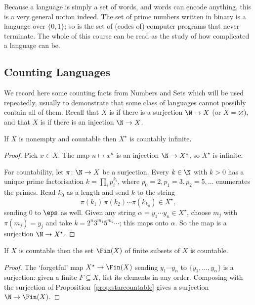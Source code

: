 Because a language is simply a set of words, and words can encode anything, this is a very general notion indeed. The set of prime numbers written in binary is a language over $\{0,1\}$; so is the set of (codes of) computer programs that never terminate. The whole of this course can be read as the study of how complicated a language can be.

\subsection{Counting Languages}

We record here some counting facts from Numbers and Sets which will be used repeatedly, usually to demonstrate that some class of languages cannot possibly contain all of them. Recall that $X$ is  if there is a surjection $\N \to X$ (or $X = \varnothing$), and that $X$ is  if there is an injection $\N \to X$.

\begin{proposition}\label{prop:starcountable}
	If $X$ is nonempty and countable then $X^\star$ is countably infinite.
\end{proposition}

\begin{proof}
	Pick $x \in X$. The map $n \mapsto x^n$ is an injection $\N \to X^\star$, so $X^\star$ is infinite.

	For countability, let $\pi \colon \N \to X$ be a surjection. Every $k \in \N$ with $k > 0$ has a unique prime factorisation $k = \prod_{i} p_i^{k_i}$, where $p_0 = 2, p_1 = 3, p_2 = 5, \dots$ enumerates the primes. Read $k_0$ as a length and send $k$ to the string
	$$\pi(k_1)\,\pi(k_2)\cdots\pi(k_{k_0}) \in X^\star,$$
	sending $0$ to $\eps$ as well. Given any string $\alpha = y_1\cdots y_n \in X^\star$, choose $m_j$ with $\pi(m_j) = y_j$ and take $k = 2^n 3^{m_1} 5^{m_2} \cdots$; this maps onto $\alpha$. So the map is a surjection $\N \to X^\star$.
\end{proof}

\begin{proposition}\label{prop:fincountable}
	If $X$ is countable then the set $\Fin(X)$ of finite subsets of $X$ is countable.
\end{proposition}

\begin{proof}
	The `forgetful' map $X^\star \to \Fin(X)$ sending $y_1\cdots y_n$ to $\{y_1, \dots, y_n\}$ is a surjection: given a finite $F \subseteq X$, list its elements in any order. Composing with the surjection of Proposition~\ref{prop:starcountable} gives a surjection $\N \to \Fin(X)$.
\end{proof}

